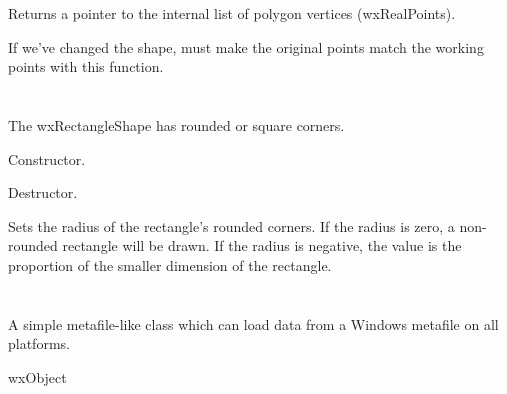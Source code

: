 

Returns a pointer to the internal list of polygon vertices (wxRealPoints).



If we've changed the shape, must make the original
points match the working points with this function.

\section{}\label{wxrectangleshape}

The wxRectangleShape has rounded or square corners.






Constructor.



Destructor.



Sets the radius of the rectangle's rounded corners. If the radius is zero, a non-rounded
rectangle will be drawn. If the radius is negative, the value is the proportion of the
smaller dimension of the rectangle.

\section{}\label{wxpseudometafile}

A simple metafile-like class which can load data from a Windows metafile on all platforms.


wxObject

